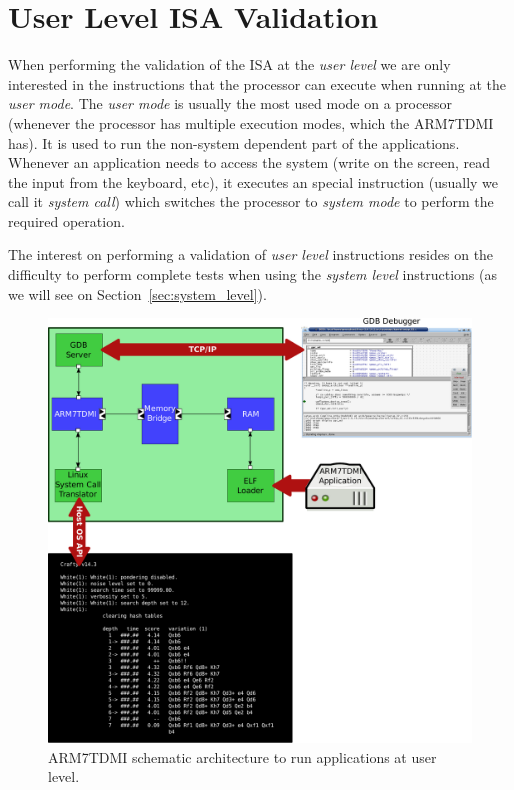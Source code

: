 \section{User Level ISA Validation}
\label{sec:user_level}

When performing the validation of the ISA at the \textit{user level} we are only interested in the instructions that the processor can execute when running at the \textit{user mode}.
The \textit{user mode} is usually the most used mode on a processor (whenever the processor has multiple execution modes, which the ARM7TDMI has).
It is used to run the non-system dependent part of the applications.
Whenever an application needs to access the system (write on the screen, read the input from the keyboard, etc), it executes an special instruction (usually we call it \textit{system call}) which switches the processor to \textit{system mode} to perform the required operation.

The interest on performing a validation of \textit{user level} instructions resides on the difficulty to perform complete tests when using the \textit{system level} instructions (as we will see on Section~\ref{sec:system_level}).

\begin{figure}[!h]
	\begin{center}
		\includegraphics[width=\textwidth]{arm7tdmi_validation/figures/ARM7TDMI_user_level.pdf}
	\end{center}
	\caption{ARM7TDMI schematic architecture to run applications at user level.}
	\label{fig:arm7tdmi_user_level}
\end{figure}

